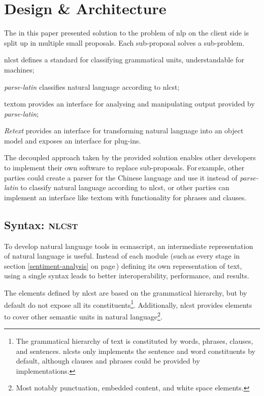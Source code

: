 \chapter{Design \& Architecture}\label{design}

The in this paper presented solution to the problem of \gls{nlp} on the
  client side is split up in multiple small proposals.
Each sub-proposal solves a sub-problem.

\begin{aenumerate}
\item\acrshort{nlcst} defines a standard for classifying grammatical units,
  understandable for machines;
\item\emph{parse-latin} classifies natural language according to
  \acrshort{nlcst};
\item\gls{textom} provides an interface for analysing and manipulating output
  provided by \emph{parse-latin};
\item\emph{Retext} provides an interface for transforming natural language
  into an object model and exposes an interface for plug-ins.
\end{aenumerate}

\noindent The decoupled approach taken by the provided solution enables other
  developers to implement their own software to replace sub-proposals.
For\,example, other parties could create a parser for the Chinese language and
  use it instead of \emph{parse-latin} to classify natural language according
  to \gls{nlcst}, or other parties can implement an interface like
  \gls{textom} with functionality for phrases and clauses.

\section{Syntax: \textsc{nlcst}}\label{syntax}

To develop natural language tools in \gls{ecmascript}, an intermediate
  representation of natural language is useful.
Instead of each module (such\,as every stage in section
  \ref{sentiment-analysis} on page\,\pageref{sentiment-analysis})
  defining its own representation of text, using a single syntax leads to
  better interoperability, performance, and results.

The elements defined by \acrfull{nlcst} are based on the grammatical
  hierarchy, but by default do not expose all its constituents\footnote{The
      grammatical hierarchy of text is constituted by words, phrases,
      clauses, and sentences.
    \glspl{nlcst} only implements the sentence and word constituents
    by default, although clauses and phrases could be provided by
    implementations.}.
Additionally, \gls{nlcst} provides elements to cover other semantic units in
  natural language\footnote{Most
    notably punctuation, embedded content, and white space elements.}.

